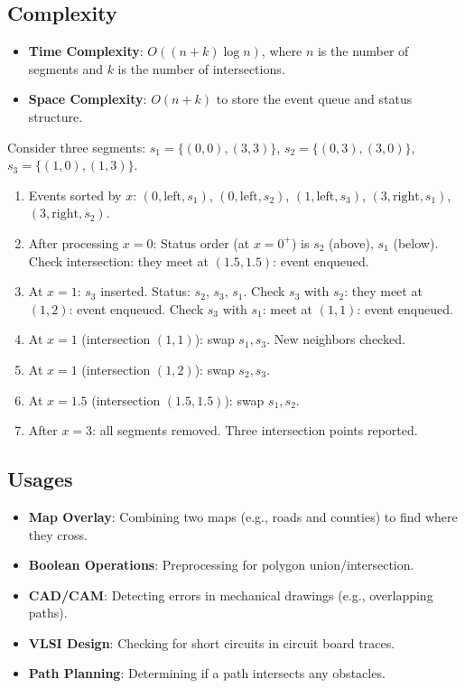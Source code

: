 \subsection{Complexity}

\begin{itemize}
\item \textbf{Time Complexity}: $O((n + k) \log n)$, where $n$ is the number of segments and $k$ is the number of intersections.
\item \textbf{Space Complexity}: $O(n + k)$ to store the event queue and status structure.
\end{itemize}

\begin{example}\label{ex:bo_trace}
Consider three segments: $s_1 = \{(0,0),(3,3)\}$, $s_2 = \{(0,3),(3,0)\}$, $s_3 = \{(1,0),(1,3)\}$.
\begin{enumerate}
\item Events sorted by $x$: $(0, \text{left}, s_1)$, $(0, \text{left}, s_2)$, $(1, \text{left}, s_3)$, $(3, \text{right}, s_1)$, $(3, \text{right}, s_2)$.
\item After processing $x=0$: Status order (at $x=0^+$) is $s_2$ (above), $s_1$ (below). Check intersection: they meet at $(1.5, 1.5)$: event enqueued.
\item At $x=1$: $s_3$ inserted. Status: $s_2$, $s_3$, $s_1$. Check $s_3$ with $s_2$: they meet at $(1, 2)$: event enqueued. Check $s_3$ with $s_1$: meet at $(1, 1)$: event enqueued.
\item At $x=1$ (intersection $(1,1)$): swap $s_1, s_3$. New neighbors checked.
\item At $x=1$ (intersection $(1,2)$): swap $s_2, s_3$.
\item At $x=1.5$ (intersection $(1.5, 1.5)$): swap $s_1, s_2$.
\item After $x=3$: all segments removed. Three intersection points reported.
\end{enumerate}
\end{example}

\subsection{Usages}

\begin{itemize}
\item \textbf{Map Overlay}: Combining two maps (e.g., roads and counties) to find where they cross.
\item \textbf{Boolean Operations}: Preprocessing for polygon union/intersection.
\item \textbf{CAD/CAM}: Detecting errors in mechanical drawings (e.g., overlapping paths).
\item \textbf{VLSI Design}: Checking for short circuits in circuit board traces.
\item \textbf{Path Planning}: Determining if a path intersects any obstacles.
\end{itemize}

